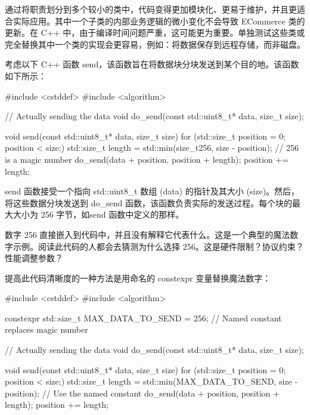通过将职责划分到多个较小的类中，代码变得更加模块化、更易于维护，并且更适合实际应用。其中一个子类的内部业务逻辑的微小变化不会导致 ECommerce 类的更新。在 C++ 中，由于编译时间问题严重，这可能更为重要。单独测试这些类或完全替换其中一个类的实现会更容易，例如：将数据保存到远程存储，而非磁盘。


考虑以下 C++ 函数 send，该函数旨在将数据块分块发送到某个目的地。该函数如下所示：

\begin{cpp}
#include <cstddef>
#include <algorithm>

// Actually sending the data
void do_send(const std::uint8_t* data, size_t size);

void send(const std::uint8_t* data, size_t size) {
    for (std::size_t position = 0; position < size;) {
        std::size_t length = std::min(size_t{256}, size - position);
        // 256 is a magic number
        do_send(data + position, position + length);
        position += length;
    }
}
\end{cpp}


send 函数接受一个指向 std::uint8\_t 数组 (data) 的指针及其大小 (size)。然后，将这些数据分块发送到 do\_send 函数，该函数负责实际的发送过程。每个块的最大大小为 256 字节，如send 函数中定义的那样。


数字 256 直接嵌入到代码中，并且没有解释它代表什么。这是一个典型的魔法数字示例。阅读此代码的人都会去猜测为什么选择 256。这是硬件限制？协议约束？性能调整参数？


提高此代码清晰度的一种方法是用命名的 constexpr 变量替换魔法数字：

\begin{cpp}
#include <cstddef>
#include <algorithm>

constexpr std::size_t MAX_DATA_TO_SEND = 256; // Named constant replaces magic number

// Actually sending the data
void do_send(const std::uint8_t* data, size_t size);

void send(const std::uint8_t* data, size_t size) {
    for (std::size_t position = 0; position < size;) {
        std::size_t length = std::min(MAX_DATA_TO_SEND, size - position); // Use the named constant
        do_send(data + position, position + length);
        position += length;
    }
}
\end{cpp}

